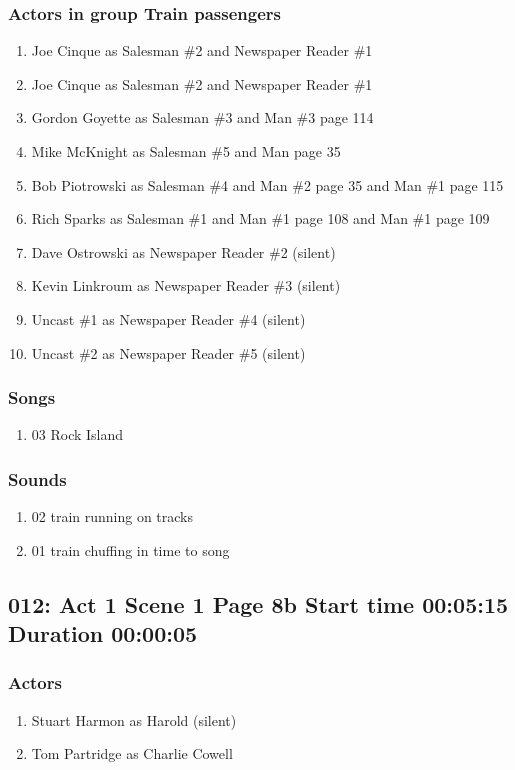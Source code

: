 \subsubsection{Actors in group Train passengers}
\begin{enumerate}
\item Joe Cinque as Salesman \#2 and Newspaper Reader \#1
\item Joe Cinque as Salesman \#2 and Newspaper Reader \#1
\item Gordon Goyette as Salesman \#3 and Man \#3 page 114
\item Mike McKnight as Salesman \#5 and Man page 35
\item Bob Piotrowski as Salesman \#4 and Man \#2 page 35 and Man \#1 page 115
\item Rich Sparks as Salesman \#1 and Man \#1 page 108 and Man \#1 page 109
\item Dave Ostrowski as Newspaper Reader \#2 (silent)
\item Kevin Linkroum as Newspaper Reader \#3 (silent)
\item Uncast \#1 as Newspaper Reader \#4 (silent)
\item Uncast \#2 as Newspaper Reader \#5 (silent)
\end{enumerate}

\subsubsection{Songs}
\begin{enumerate}
\item 03 Rock Island
\end{enumerate}\subsubsection{Sounds}
\begin{enumerate}
\item 02 train running on tracks
\item 01 train chuffing in time to song
\end{enumerate}
\subsection{012: Act 1 Scene 1 Page 8b Start time 00:05:15 Duration 00:00:05}

\subsubsection{Actors}
\begin{enumerate}
\item Stuart Harmon as Harold (silent)
\item Tom Partridge as Charlie Cowell
\end{enumerate}

